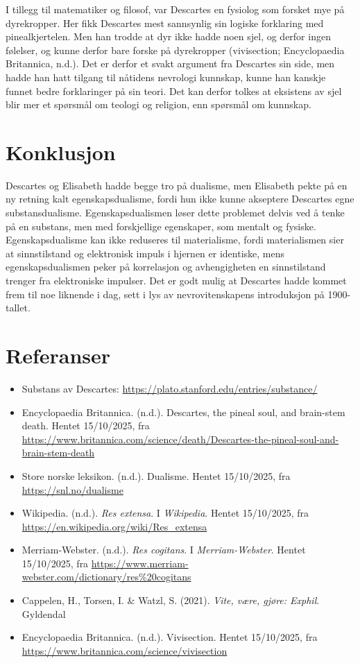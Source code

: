 \documentclass[12pt, a4paper]{article}
\begin{document}
I tillegg til matematiker og filosof, var Descartes en fysiolog som forsket mye på dyrekropper. Her fikk Descartes mest sannsynlig sin logiske forklaring med pinealkjertelen. Men han trodde at dyr ikke hadde noen sjel, og derfor ingen følelser, og kunne derfor bare forske på dyrekropper (vivisection; Encyclopaedia Britannica, n.d.). Det er derfor et svakt argument fra Descartes sin side, men hadde han hatt tilgang til nåtidens nevrologi kunnskap, kunne han kanskje funnet bedre forklaringer på sin teori. Det kan derfor tolkes at eksistens av sjel blir mer et spørsmål om teologi og religion, enn spørsmål om kunnskap.

\section{Konklusjon}

Descartes og Elisabeth hadde begge tro på dualisme, men Elisabeth pekte på en ny retning kalt egenskapsdualisme, fordi hun ikke kunne akseptere Descartes egne substansdualisme. Egenskapsdualismen løser dette problemet delvis ved å tenke på en substans, men med forskjellige egenskaper, som mentalt og fysiske. Egenskapsdualisme kan ikke reduseres til materialisme, fordi materialismen sier at sinnstilstand og elektronisk impuls i hjernen er identiske, mens egenskapsdualismen peker på korrelasjon og avhengigheten en sinnstilstand trenger fra elektroniske impulser. Det er godt mulig at Descartes hadde kommet frem til noe liknende i dag, sett i lys av nevrovitenskapens introduksjon på 1900-tallet.

\section{Referanser}


\begin{itemize}
    \item Substans av Descartes: \url{https://plato.stanford.edu/entries/substance/}
    \item Encyclopaedia Britannica. (n.d.). Descartes, the pineal soul, and brain-stem death. Hentet 15/10/2025, fra \url{https://www.britannica.com/science/death/Descartes-the-pineal-soul-and-brain-stem-death}
    \item Store norske leksikon. (n.d.). Dualisme. Hentet 15/10/2025, fra \url{https://snl.no/dualisme}
    \item Wikipedia. (n.d.). \textit{Res extensa}. I \textit{Wikipedia}. Hentet 15/10/2025, fra \url{https://en.wikipedia.org/wiki/Res_extensa}
    \item Merriam-Webster. (n.d.). \textit{Res cogitans}. I \textit{Merriam-Webster}. Hentet 15/10/2025, fra \url{https://www.merriam-webster.com/dictionary/res%20cogitans}
    \item Cappelen, H., Torsen, I. \& Watzl, S. (2021). \textit{Vite, være, gjøre: Exphil}. Gyldendal
    \item Encyclopaedia Britannica. (n.d.). Vivisection. Hentet 15/10/2025, fra \url{https://www.britannica.com/science/vivisection}
\end{itemize}
\end{document}
